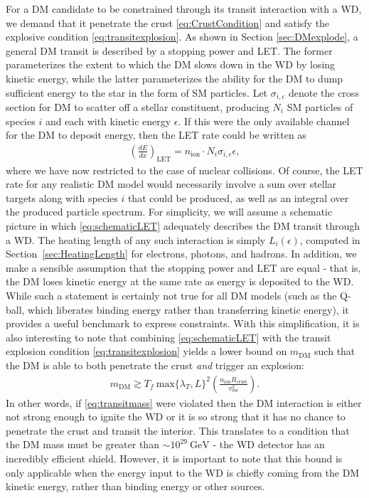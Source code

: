 \documentclass[twocolumn,showpacs,preprintnumbers,amsmath,amssymb,prd]{revtex4}
\newcommand{\GeV}{\text{GeV}}
\def\r{\right)}
\def\l{\left(}
\begin{document}
For a DM candidate to be constrained through its transit interaction with a WD, we demand that it penetrate the crust \eqref{eq:CrustCondition} and satisfy the explosive condition \eqref{eq:transitexplosion}.
As shown in Section \ref{sec:DMexplode}, a general DM transit is described by a stopping power and LET.
The former parameterizes the extent to which the DM slows down in the WD by losing kinetic energy, while the latter parameterizes the ability for the DM to dump sufficient energy to the star in the form of SM particles.
Let $\sigma_{i,\epsilon}$ denote the cross section for DM to scatter off a stellar constituent, producing $N_i$ SM particles of species $i$ and each with kinetic energy $\epsilon$.
If this were the only available channel for the DM to deposit energy, then the LET rate could be written as
\begin{align}
\label{eq:schematicLET}
  \left( \frac{d E}{d x} \right)_\text{LET} = n_\text{ion} \cdot N_i \sigma_{i,\epsilon} \epsilon,
\end{align}
where we have now restricted to the case of nuclear collisions.
Of course, the LET rate for any realistic DM model would necessarily involve a sum over stellar targets along with species $i$ that could be produced, as well as an integral over the produced particle spectrum.
For simplicity, we will assume a schematic picture in which \eqref{eq:schematicLET} adequately describes the DM transit through a WD.
The heating length of any such interaction is simply $L_i(\epsilon)$, computed in Section~\ref{sec:HeatingLength} for electrons, photons, and hadrons.
In addition, we make a sensible assumption that the stopping power and LET are equal - that is, the DM loses kinetic energy at the same rate as energy is deposited to the WD.
While such a statement is certainly not true for all DM models (such as the Q-ball, which liberates binding energy rather than transferring kinetic energy), it provides a useful benchmark to express constraints.
With this simplification, it is also interesting to note that combining \eqref{eq:schematicLET} with the transit explosion condition \eqref{eq:transitexplosion} yields a lower bound on $m_{\text{DM}}$ such that the DM is able to both penetrate the crust \emph{and} trigger an explosion:
\begin{align}
\label{eq:transitmass}
m_{\text{DM}} \gtrsim  T_f ~\text{max}\{\lambda_T, L\}^2 \l \frac{n_{\text{ion}} R_{\text{crust}}}{v_{\text{esc}}^2} \r.
\end{align}
In other words, if \eqref{eq:transitmass} were violated then the DM interaction is either not strong enough to ignite the WD or it is so strong that it has no chance to penetrate the crust and transit the interior.
This translates to a condition that the DM mass must be greater than $\sim 10^{29} ~\GeV$ - the WD detector has an incredibly efficient shield.
However, it is important to note that this bound is only applicable when the energy input to the WD is chiefly coming from the DM kinetic energy, rather than binding energy or other sources.
\end{document}
